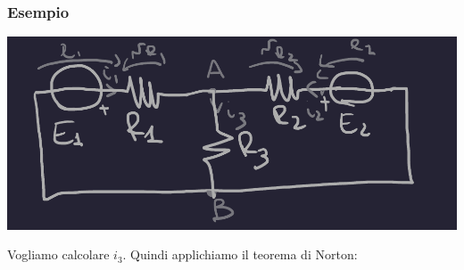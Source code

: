 \documentclass{article}
\begin{document}
\subsubsection{Esempio}
\begin{center}
    \includegraphics[scale=0.25]{Image/Esempio_Norton_0.png}
\end{center}
Vogliamo calcolare $i_3$. Quindi applichiamo il teorema di Norton:
\end{document}
